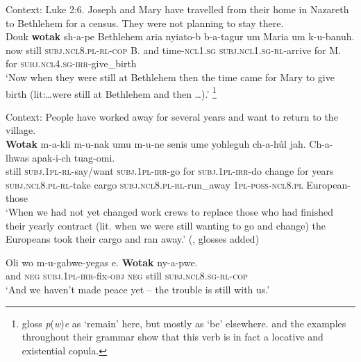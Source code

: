 \begin{exe}
	\ex\label{exAppendixBukiyip1}
	Context: Luke 2:6. Joseph and Mary have travelled from their home in Nazareth to Bethlehem for a census. They were not planning to stay there.\\
	\gll Douk \textbf{wotak} sh-a-pe Bethlehem aria nyiato-b b-a-tagur um Maria um k-u-banuh.\\
	now still \textsc{subj}.\textsc{ncl}8.\textsc{pl}-\textsc{rl}-\textsc{cop} B. and time-\textsc{ncl}1.\textsc{sg} \textsc{subj}.\textsc{ncl}1.\textsc{sg}-\textsc{rl}-arrive for M. for \textsc{subj}.\textsc{ncl}4.\textsc{sg}-\textsc{irr}-give\_birth\\
	\glt \lq Now when they were still at Bethlehem then the time came for Mary to give birth (lit:…were still at Bethlehem and then …).' \parencite[63]{Conrad1998}\footnote{\citeauthor{Conrad1998} gloss \textit{p}(\textit{w})\textit{e} as \lq remain' here, but mostly as \lq be' elsewhere. \textcite[33]{ConradWigoga1991} and the examples throughout their grammar show that this verb is in fact a locative and existential copula.}
		
	\ex\label{exAppendixBukiyip2}
	Context: People have worked away for several years and want to return to the village.\\
	\gll \textbf{Wotak} m-a-kli m-u-nak umu m-u-ne senis ume yohleguh ch-a-húl jah. Ch-a-lhwas apak-i-ch tuag-omi.\\
	still \textsc{subj}.1\textsc{pl}-\textsc{rl}-say/want \textsc{subj}.1\textsc{pl}-\textsc{irr}-go for \textsc{subj}.1\textsc{pl}-\textsc{irr}-do change for years \textsc{subj}.\textsc{ncl}8.\textsc{pl}-\textsc{rl}-take cargo \textsc{subj}.\textsc{ncl}8.\textsc{pl}-\textsc{rl}-run\_away 1\textsc{pl}-\textsc{poss}-\textsc{ncl}8.\textsc{pl} European-those\\
	\glt \lq When we had not yet changed work crews to replace those who had finished their yearly contract (lit. when we were still wanting to go and change) the Europeans took their cargo and ran away.\rq{} (\cite[205]{ConradWigoga1991}, glosses added)
	
	\ex\label{exAppendixBukiyip3}
	\gll Oli wo m-u-gabwe-yegas e. \textbf{Wotak} ny-a-pwe.\\
and \textsc{neg} \textsc{subj}.1\textsc{pl}-\textsc{irr}-fix-\textsc{obj} \textsc{neg} still \textsc{subj}.\textsc{ncl}8.\textsc{sg}-\textsc{rl}-\textsc{cop}\\
	\glt \lq And we haven't made peace yet -- the trouble is still with us.\rq{ }\parencite[186]{ConradWigoga1991}
\end{exe}


